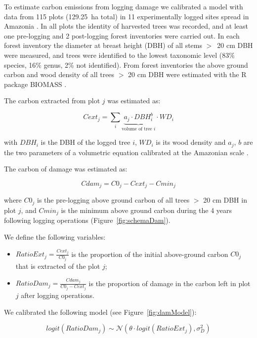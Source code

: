 \documentclass{article}
\begin{document}
To estimate carbon emissions from logging damage we calibrated a model with data from 115 plots (129.25~ha total) in 11 experimentally logged sites spread in Amazonia \cite{Sist2015}. In all plots the identity of harvested trees was recorded, and at least one pre-logging and 2 post-logging forest inventories were carried out. In each forest inventory the diameter at breast height (DBH) of all stems $>$~20 cm DBH were measured, and trees were identified to the lowest taxonomic level (83\% species, 16\% genus, 2\% not identified). 
From forest inventories the above ground carbon and wood density of all trees $>$ 20 cm DBH  were estimated with the R package BIOMASS \cite{Rejou-Mechain2017}. 

The carbon extracted from plot $j$ was estimated as: 

\begin{equation}
    Cext_j = \sum_{i} \underbrace{a_j \cdot DBH_i^b}_{\text{volume of tree $i$}} \cdot WD_i
\end{equation}

with $DBH_i$ is the DBH of the logged tree $i$, $WD_i$ is its wood density and $a_j$, $b$ are the two parameters of a volumetric equation calibrated at the Amazonian scale \cite{Piponiotc}. 

The carbon of damage was estimated as: 

\begin{equation}
    Cdam_j = C0_j - Cext_j - Cmin_j
\end{equation}

where $C0_j$ is the pre-logging above ground carbon of all trees $>$ 20 cm DBH in plot $j$, and $Cmin_j$ is the minimum above ground carbon during the 4 years following logging operations (Figure~\ref{fig:schemaDam}). 

We define the following variables: 

\begin{itemize}
    \item $RatioExt_j=\frac{Cext_j}{C0_j}$ is the proportion of the initial above-ground carbon $C0_j$ that is extracted of the plot $j$; 
    \item $RatioDam_j = \frac{Cdam_j}{C0_j-Cext_j}$ is the proportion of damage in the carbon left in plot $j$ after logging operations. 
\end{itemize}

We calibrated the following model (see Figure~\ref{fig:damModel}): 

\begin{equation}
logit(RatioDam_j) \sim \mathcal{N}(\theta \cdot logit(RatioExt_j), \sigma_D^2)
\end{equation} 
\end{document}
